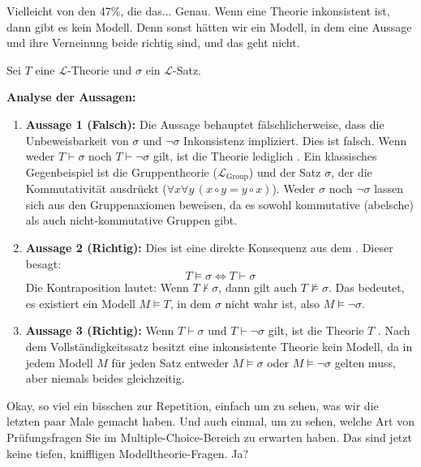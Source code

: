 \begin{spoken-clean}[00:04:12 - 00:04:27]
Vielleicht von den 47\%, die das... Genau. Wenn eine Theorie inkonsistent ist, dann gibt es kein Modell. Denn sonst hätten wir ein Modell, in dem eine Aussage und ihre Verneinung beide richtig sind, und das geht nicht.
\end{spoken-clean}

\begin{math-stroke}
Sei $T$ eine $\mathcal{L}$-Theorie und $\sigma$ ein $\mathcal{L}$-Satz.

\textbf{Analyse der Aussagen:}
\begin{enumerate}[label=\textbf{\arabic*.}]
    \item \textbf{Aussage 1 (Falsch):} Die Aussage behauptet fälschlicherweise, dass die Unbeweisbarkeit von $\sigma$ und $\neg\sigma$ Inkonsistenz impliziert. 
    Dies ist falsch. Wenn weder $T \vdash \sigma$ noch $T \vdash \neg\sigma$ gilt, ist die Theorie lediglich . Ein klassisches Gegenbeispiel ist die Gruppentheorie ($\mathcal{L}_{\text{Group}}$) und der Satz $\sigma$, der die Kommutativität ausdrückt ($\forall x \forall y \, (x \circ y = y \circ x)$). Weder $\sigma$ noch $\neg\sigma$ lassen sich aus den Gruppenaxiomen beweisen, da es sowohl kommutative (abelsche) als auch nicht-kommutative Gruppen gibt.
    
    \item \textbf{Aussage 2 (Richtig):} Dies ist eine direkte Konsequenz aus dem . Dieser besagt:
    \[
    T \models \sigma \iff T \vdash \sigma
    \]
    Die Kontraposition lautet: Wenn $T \not\vdash \sigma$, dann gilt auch $T \not\models \sigma$. Das bedeutet, es existiert ein Modell $M \models T$, in dem $\sigma$ nicht wahr ist, also $M \models \neg\sigma$.
    
    \item \textbf{Aussage 3 (Richtig):} Wenn $T \vdash \sigma$ und $T \vdash \neg\sigma$ gilt, ist die Theorie $T$ . Nach dem Vollständigkeitssatz besitzt eine inkonsistente Theorie kein Modell, da in jedem Modell $M$ für jeden Satz entweder $M \models \sigma$ oder $M \models \neg\sigma$ gelten muss, aber niemals beides gleichzeitig.
\end{enumerate}
\end{math-stroke}

\begin{spoken-clean}[00:04:27 - 00:06:36]
Okay, so viel ein bisschen zur Repetition, einfach um zu sehen, was wir die letzten paar Male gemacht haben. Und auch einmal, um zu sehen, welche Art von Prüfungsfragen Sie im Multiple-Choice-Bereich zu erwarten haben. Das sind jetzt keine tiefen, kniffligen Modelltheorie-Fragen. Ja?
\end{spoken-clean}

